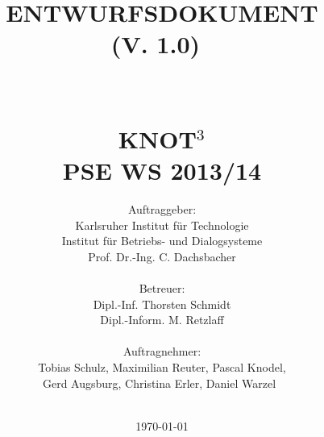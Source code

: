 \documentclass{scrreprt}
\begin{document}
\title{\textbf{\Huge{ENTWURFSDOKUMENT}}\\\Large{(V. 1.0)}~\\~\\~\\
		\textbf{\Large{KNOT$^3$}}\\
		PSE WS 2013/14}
\author{\Large{Auftraggeber:}\\
        \Large{Karlsruher Institut für Technologie}\\
        \Large{Institut für Betriebs- und Dialogsysteme}\\
        \Large{Prof. Dr.-Ing. C. Dachsbacher}\\~\\
        \Large{Betreuer:}\\
        \Large{Dipl.-Inf. Thorsten Schmidt}\\
        \Large{Dipl.-Inform. M. Retzlaff}\\~\\
        \Large{Auftragnehmer:}\\
        \Large{Tobias Schulz, Maximilian Reuter, Pascal                    Knodel,}\\
	 	\Large{Gerd Augsburg, Christina Erler, Daniel Warzel}~\\~\\}
\date{\today}

\maketitle

\tableofcontents






\appendix



\end{document}
